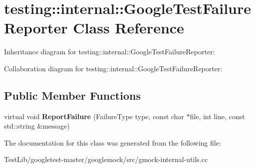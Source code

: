 \hypertarget{classtesting_1_1internal_1_1GoogleTestFailureReporter}{}\section{testing\+:\+:internal\+:\+:Google\+Test\+Failure\+Reporter Class Reference}
\label{classtesting_1_1internal_1_1GoogleTestFailureReporter}


Inheritance diagram for testing\+:\+:internal\+:\+:Google\+Test\+Failure\+Reporter\+:


Collaboration diagram for testing\+:\+:internal\+:\+:Google\+Test\+Failure\+Reporter\+:
\subsection*{Public Member Functions}
\begin{DoxyCompactItemize}
\item 
\mbox{\label{classtesting_1_1internal_1_1GoogleTestFailureReporter_a096dae47177340acac5f3d6528b852ca}} 
virtual void {\bfseries Report\+Failure} (Failure\+Type type, const char $\ast$file, int line, const std\+::string \&message)
\end{DoxyCompactItemize}


The documentation for this class was generated from the following file\+:\begin{DoxyCompactItemize}
\item 
Test\+Lib/googletest-\/master/googlemock/src/gmock-\/internal-\/utils.\+cc\end{DoxyCompactItemize}
